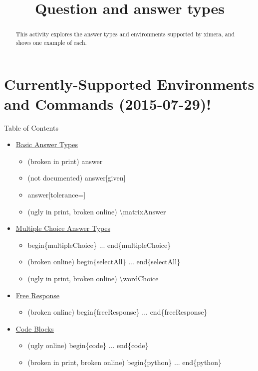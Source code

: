 \documentclass{ximera}
\title{Question and answer types}
\begin{document}
\begin{abstract}
  This activity explores the answer types and environments supported by ximera, and shows one example of each.
\end{abstract}

\maketitle

\section{Currently-Supported Environments and Commands (2015-07-29)!}

\begin{remark} Table of Contents

\begin{itemize}
\item \hyperref[BasicAnswerType]{Basic Answer Types}
  \begin{itemize}
    \item (broken in print) answer
    \item (not documented) answer[given]
    \item answer[tolerance=]
    \item (ugly in print, broken online) \textbackslash matrixAnswer  
  \end{itemize}
\item \hyperref[MCAnswerType]{Multiple Choice Answer Types}
  \begin{itemize}
    \item begin\{multipleChoice\} ... end\{multipleChoice\}
    \item (broken online) begin\{selectAll\} ... end\{selectAll\}
    \item (ugly in print, broken online) \textbackslash wordChoice
  \end{itemize}    
\item \hyperref[FRAnswerType]{Free Response}
  \begin{itemize}   
    \item (broken online) begin\{freeResponse\} ... end\{freeResponse\}
  \end{itemize}
\item \hyperref[CodeAnswers]{Code Blocks}
  \begin{itemize}
    \item (ugly online) begin\{code\} ... end\{code\}
    \item (broken in print, broken online) begin\{python\} ... end\{python\}

\end{itemize}
\end{itemize}
\end{remark}
\end{document}
